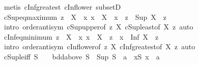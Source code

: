 \begin{isabellebody}
\ {\isacharparenleft}{\kern0pt}metis\ cInf{\isacharunderscore}{\kern0pt}greatest\ cInf{\isacharunderscore}{\kern0pt}lower\ subsetD{\isacharparenright}{\kern0pt}%
\endisatagproof
{\isafoldproof}%
%
\isadelimproof
\isanewline
%
\endisadelimproof
\isanewline
{}\isamarkupfalse%
\ cSup{\isacharunderscore}{\kern0pt}eq{\isacharunderscore}{\kern0pt}maximum{\isacharcolon}{\kern0pt}\ {\isachardoublequoteopen}z\ {\isasymin}\ X\ {\isasymLongrightarrow}\ {\isacharparenleft}{\kern0pt}{\isasymAnd}x{\isachardot}{\kern0pt}\ x\ {\isasymin}\ X\ {\isasymLongrightarrow}\ x\ {\isasymle}\ z{\isacharparenright}{\kern0pt}\ {\isasymLongrightarrow}\ Sup\ X\ {\isacharequal}{\kern0pt}\ z{\isachardoublequoteclose}\isanewline
%
\isadelimproof
\ \ %
\endisadelimproof
%
\isatagproof
{}\isamarkupfalse%
\ {\isacharparenleft}{\kern0pt}intro\ order{\isachardot}{\kern0pt}antisym\ cSup{\isacharunderscore}{\kern0pt}upper{\isacharbrackleft}{\kern0pt}of\ z\ X{\isacharbrackright}{\kern0pt}\ cSup{\isacharunderscore}{\kern0pt}least{\isacharbrackleft}{\kern0pt}of\ X\ z{\isacharbrackright}{\kern0pt}{\isacharparenright}{\kern0pt}\ auto%
\endisatagproof
{\isafoldproof}%
%
\isadelimproof
\isanewline
%
\endisadelimproof
\isanewline
{}\isamarkupfalse%
\ cInf{\isacharunderscore}{\kern0pt}eq{\isacharunderscore}{\kern0pt}minimum{\isacharcolon}{\kern0pt}\ {\isachardoublequoteopen}z\ {\isasymin}\ X\ {\isasymLongrightarrow}\ {\isacharparenleft}{\kern0pt}{\isasymAnd}x{\isachardot}{\kern0pt}\ x\ {\isasymin}\ X\ {\isasymLongrightarrow}\ z\ {\isasymle}\ x{\isacharparenright}{\kern0pt}\ {\isasymLongrightarrow}\ Inf\ X\ {\isacharequal}{\kern0pt}\ z{\isachardoublequoteclose}\isanewline
%
\isadelimproof
\ \ %
\endisadelimproof
%
\isatagproof
{}\isamarkupfalse%
\ {\isacharparenleft}{\kern0pt}intro\ order{\isachardot}{\kern0pt}antisym\ cInf{\isacharunderscore}{\kern0pt}lower{\isacharbrackleft}{\kern0pt}of\ z\ X{\isacharbrackright}{\kern0pt}\ cInf{\isacharunderscore}{\kern0pt}greatest{\isacharbrackleft}{\kern0pt}of\ X\ z{\isacharbrackright}{\kern0pt}{\isacharparenright}{\kern0pt}\ auto%
\endisatagproof
{\isafoldproof}%
%
\isadelimproof
\isanewline
%
\endisadelimproof
\isanewline
{}\isamarkupfalse%
\ cSup{\isacharunderscore}{\kern0pt}le{\isacharunderscore}{\kern0pt}iff{\isacharcolon}{\kern0pt}\ {\isachardoublequoteopen}S\ {\isasymnoteq}\ {\isacharbraceleft}{\kern0pt}{\isacharbraceright}{\kern0pt}\ {\isasymLongrightarrow}\ bdd{\isacharunderscore}{\kern0pt}above\ S\ {\isasymLongrightarrow}\ Sup\ S\ {\isasymle}\ a\ {\isasymlongleftrightarrow}\ {\isacharparenleft}{\kern0pt}{\isasymforall}x{\isasymin}S{\isachardot}{\kern0pt}\ x\ {\isasymle}\ a{\isacharparenright}{\kern0pt}{\isachardoublequoteclose}\isanewline

\end{isabellebody}
